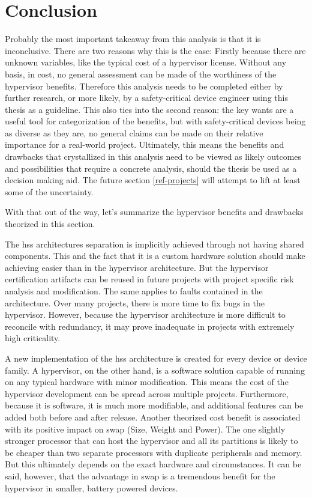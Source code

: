 \section{Conclusion}
Probably the most important takeaway from this analysis is that it is inconclusive. There are two reasons why this is the case: Firstly because there are unknown variables, like the typical cost of a hypervisor license. Without any basis, in cost, no general assessment can be made of the worthiness of the hypervisor benefits. Therefore this analysis needs to be completed either by further research, or more likely, by a safety-critical device engineer using this thesis as a guideline. This also ties into the second reason: the key wants are a useful tool for categorization of the benefits, but with safety-critical devices being as diverse as they are, no general claims can be made on their relative importance for a real-world project. Ultimately, this means the benefits and drawbacks that crystallized in this analysis need to be viewed as likely outcomes and possibilities that require a concrete analysis, should the thesis be used as a decision making aid. The future section \ref{ref-projects} will attempt to lift at least some of the uncertainty.

With that out of the way, let's summarize the hypervisor benefits 
and drawbacks theorized in this section.

The \acrshort{hss} architectures separation is implicitly achieved through not having shared components. This and the fact that it is a custom hardware solution should make achieving  easier than in the hypervisor architecture. But the hypervisor certification artifacts can be reused in future projects with project specific risk analysis and modification. The same applies to faults contained in the architecture. Over many projects, there is more time to fix bugs in the hypervisor. However, because the hypervisor architecture is more difficult to reconcile with redundancy, it may prove inadequate in projects with extremely high criticality.

A new implementation of the \acrshort{hss} architecture is created for every device or device family. A hypervisor, on the other hand, is a software solution capable of running on any typical hardware with minor modification. This means the cost of the hypervisor development can be spread across multiple projects. Furthermore, because it is software, it is much more modifiable, and additional features can be added both before and after release. Another theorized cost benefit is associated with its positive impact on \acrshort{swap} (Size, Weight and Power). The one slightly stronger processor that can host the hypervisor and all its partitions is likely to be cheaper than two separate processors with duplicate peripherals and memory. But this ultimately depends on the exact hardware and circumstances. It can be said, however, that the advantage in \acrshort{swap} is a tremendous benefit for the hypervisor in smaller, battery powered devices.

